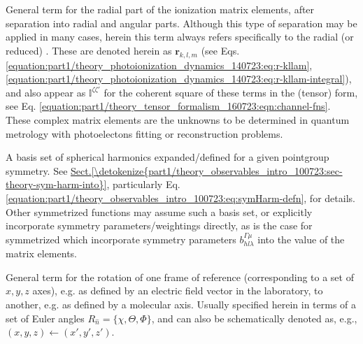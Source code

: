 \documentclass[letterpaper,table,10pt,english]{jupyterBook}
\begin{document}
\begin{description}
\sphinxAtStartPar
General term for the radial part of the ionization matrix elements, after separation into radial and angular parts. Although this type of separation may be applied in many cases, herein this term always refers specifically to the radial (or reduced) . These are denoted herein as \(\mathbf{r}_{k,l,m}\) (see Eqs. \eqref{equation:part1/theory_photoionization_dynamics_140723:eq:r-kllam}, \eqref{equation:part1/theory_photoionization_dynamics_140723:eq:r-kllam-integral}), and also appear as \(\mathbb{I}^{\zeta\zeta'}\) for the coherent square of these terms in the {\hyperref[\detokenize{backmatter/glossary:term-channel-functions}]{}} (tensor) form, see Eq. \eqref{equation:part1/theory_tensor_formalism_160723:eqn:channel-fns}. These complex matrix elements are the unknowns to be determined in quantum metrology with photoelectons fitting or reconstruction problems.

\sphinxAtStartPar
A basis set of spherical harmonics expanded/defined for a given point\sphinxhyphen{}group symmetry. See \hyperref[\detokenize{part1/theory_observables_intro_100723:sec-theory-sym-harm-into}]{Sect.\@ \ref{\detokenize{part1/theory_observables_intro_100723:sec-theory-sym-harm-into}}}, particularly Eq. \eqref{equation:part1/theory_observables_intro_100723:eq:symHarm-defn}, for details. Other symmetrized functions may assume such a basis set, or explicitly incorporate symmetry parameters/weightings directly, as is the case for symmetrized {\hyperref[\detokenize{backmatter/glossary:term-radial-matrix-elements}]{}} which incorporate symmetry parameters \(b_{hl\lambda}^{\Gamma\mu}\) into the value of the matrix elements.

\sphinxAtStartPar
General term for the rotation of one frame of reference (corresponding to a set of \(x,y,z\) axes), e.g. as defined by an electric field vector in the laboratory, to another, e.g. as defined by a molecular axis. Usually specified herein in terms of a set of Euler angles \(R_{\hat{n}}=\{\chi,\Theta,\Phi\}\), and can also be schematically denoted as, e.g., \((x,y,z)\leftarrow(x',y',z')\).


\end{description}
\end{document}
